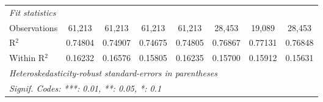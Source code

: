 \begin{table}[htbp]
\begin{tabular}{lccccccc}
      \midrule
      \emph{Fit statistics}\\
      Observations                               & 61,213         & 61,213         & 61,213         & 61,213         & 28,453         & 19,089          & 28,453\\  
      R$^2$                                      & 0.74804        & 0.74907        & 0.74675        & 0.74805        & 0.76867        & 0.77131         & 0.76848\\  
      Within R$^2$                               & 0.16232        & 0.16576        & 0.15805        & 0.16235        & 0.15700        & 0.15912         & 0.15631\\  
      \midrule \midrule
      \multicolumn{8}{l}{\emph{Heteroskedasticity-robust standard-errors in parentheses}}\\
      \multicolumn{8}{l}{\emph{Signif. Codes: ***: 0.01, **: 0.05, *: 0.1}}\\
   \end{tabular}
\end{table}


